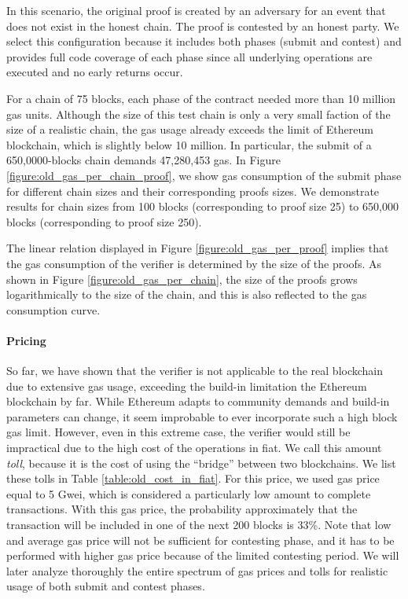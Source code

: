 

In this scenario, the original proof is created by an adversary for an event
that does not exist in the honest chain. The proof is contested by an honest
party. We select this configuration because it includes both phases
(submit and contest) and provides full code coverage of each phase since all
underlying operations are executed and no early returns occur.

For a chain of 75 blocks, each phase of the contract needed more than 10
million gas units. Although the size of this test chain is only a very small
faction of the size of a realistic chain, the gas usage already exceeds the
limit of Ethereum blockchain, which is slightly below 10 million. In
particular, the submit of a 650,0000-blocks chain demands 47,280,453 gas. In
Figure \ref{figure:old_gas_per_chain_proof}, we show gas consumption of the submit
phase for different chain sizes and their corresponding proofs sizes. We
demonstrate results for chain sizes from 100 blocks (corresponding to proof size
25) to 650,000 blocks (corresponding to proof size 250).

The linear relation displayed in Figure \ref{figure:old_gas_per_proof} implies
that the gas consumption of the verifier is determined by the size of the
proofs. As shown in Figure \ref{figure:old_gas_per_chain}, the size of the
proofs grows logarithmically to the size of the chain, and this is also
reflected to the gas consumption curve.



\paragraph{Pricing}

So far, we have shown that the verifier is not applicable to the real
blockchain due to extensive gas usage, exceeding the build-in limitation the
Ethereum blockchain by far. While Ethereum adapts to community demands and
build-in parameters can change, it seem improbable to ever incorporate such a
high block gas limit. However, even in this extreme case, the verifier would
still be impractical due to the high cost of the operations in fiat. We call
this amount \emph{toll}, because it is the cost of using the ``bridge'' between
two blockchains. We list these tolls in Table \ref{table:old_cost_in_fiat}. For
this price, we used gas price equal to 5 Gwei, which is considered a
particularly low amount to complete transactions. With this gas price, the
probability approximately that the transaction will be included in one of the
next 200 blocks is 33\%. Note that low and average gas price will not be
sufficient for contesting phase, and it has to be performed with higher gas
price because of the limited contesting period. We will later analyze
thoroughly the entire spectrum of gas prices and tolls for realistic usage of
both submit and contest phases.

